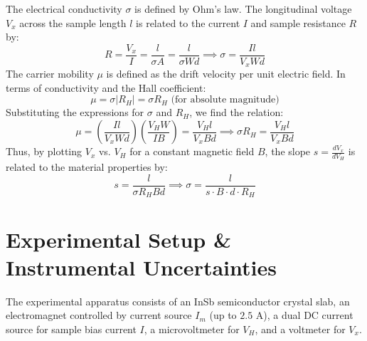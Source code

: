 \documentclass[a4paper,11pt]{article}
\begin{document}
The electrical conductivity $\sigma$ is defined by Ohm's law. The longitudinal voltage $V_x$ across the sample length $l$ is related to the current $I$ and sample resistance $R$ by:
\begin{equation}
    R = \frac{V_x}{I} = \frac{l}{\sigma A} = \frac{l}{\sigma W d} \implies \sigma = \frac{I l}{V_x W d}
\end{equation}
The carrier mobility $\mu$ is defined as the drift velocity per unit electric field. In terms of conductivity and the Hall coefficient:
\begin{equation}
    \mu = \sigma |R_H| = \sigma R_H \text{ (for absolute magnitude)}
\end{equation}
Substituting the expressions for $\sigma$ and $R_H$, we find the relation:
\begin{equation}
    \mu = \left(\frac{I l}{V_x W d}\right) \left(\frac{V_H W}{I B}\right) = \frac{V_H l}{V_x B d} \implies \sigma R_H = \frac{V_H l}{V_x B d}
\end{equation}
Thus, by plotting $V_x$ vs. $V_H$ for a constant magnetic field $B$, the slope $s = \frac{d V_x}{d V_H}$ is related to the material properties by:
\begin{equation}
    s = \frac{l}{\sigma R_H B d} \implies \sigma = \frac{l}{s \cdot B \cdot d \cdot R_H}
\end{equation}

\section{Experimental Setup \& Instrumental Uncertainties}
The experimental apparatus consists of an InSb semiconductor crystal slab, an electromagnet controlled by current source $I_m$ (up to $2.5\text{ A}$), a dual DC current source for sample bias current $I$, a microvoltmeter for $V_H$, and a voltmeter for $V_x$. 
\end{document}
